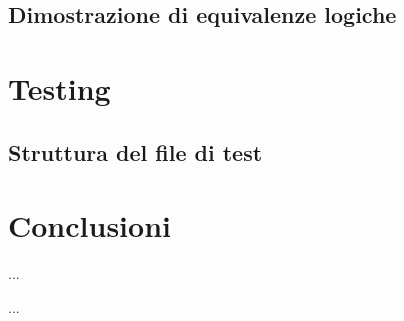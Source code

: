 \documentclass[a4paper,12pt]{report}
\begin{document}
\section{Dimostrazione di equivalenze logiche}

% 
% 
\chapter{Testing}
\label{testing}

\section{Struttura del file di test}

% 
% 
\chapter{Conclusioni}
\label{conclusion}

%
%
\begin{thebibliography}{00}



%
...
%
%
\end{thebibliography}
% 

%
%
...
\end{document}
